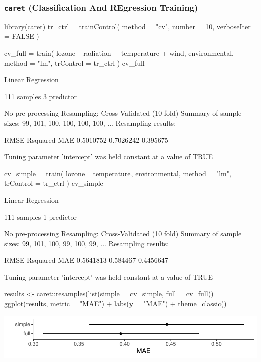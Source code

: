 \documentclass[a4paper]{article}\usepackage[]{graphicx}\usepackage[]{xcolor}
\makeatletter
\def\maxwidth{ %
  \ifdim\Gin@nat@width>\linewidth
    \linewidth
  \else
    \Gin@nat@width
  \fi
}
\makeatother
\begin{document}
\subsubsection{\lstinline|caret| (Classification And REgression Training)}
\begin{Schunk}
\begin{Sinput}
library(caret)
tr_ctrl = trainControl(
    method = "cv", number = 10,
    verboseIter = FALSE
  )

cv_full = train(
  lozone ~ radiation + temperature + wind, environmental,
  method = "lm",
  trControl = tr_ctrl
)
cv_full
\end{Sinput}
\begin{Soutput}
Linear Regression 

111 samples
  3 predictor

No pre-processing
Resampling: Cross-Validated (10 fold) 
Summary of sample sizes: 99, 101, 100, 100, 100, 100, ... 
Resampling results:

  RMSE       Rsquared   MAE     
  0.5010752  0.7026242  0.395675

Tuning parameter 'intercept' was held constant at a value of TRUE
\end{Soutput}
\begin{Sinput}
cv_simple = train(
  lozone ~ temperature, 
  environmental,
  method = "lm",
  trControl = tr_ctrl
)
cv_simple
\end{Sinput}
\begin{Soutput}
Linear Regression 

111 samples
  1 predictor

No pre-processing
Resampling: Cross-Validated (10 fold) 
Summary of sample sizes: 99, 101, 100, 99, 100, 99, ... 
Resampling results:

  RMSE       Rsquared  MAE      
  0.5641813  0.584467  0.4456647

Tuning parameter 'intercept' was held constant at a value of TRUE
\end{Soutput}
\begin{Sinput}
results <- caret::resamples(list(simple = cv_simple,  full = cv_full))
ggplot(results, metric = "MAE") +
  labs(y = "MAE") +
  theme_classic()
\end{Sinput}


{\centering \includegraphics[width=\maxwidth]{figure/listings-unnamed-chunk-407-1} 

}
\end{Schunk}
\end{document}
